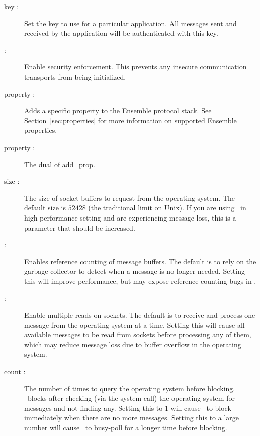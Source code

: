 \begin{description}
\item
[\mlval{-key} key :] Set the key to use for a particular application.  All
messages sent and received by the application will be authenticated with this
key.
\item
[\mlval{-secure} :] Enable security enforcement.  This prevents any insecure
communication transports from being initialized.
\item
[\mlval{-add\_prop} property :] Adds a specific property to the
Ensemble protocol stack. See Section~\ref{sec:properties} for more
information on supported Ensemble properties. 
\item 
[\mlval{-remove\_prop} property :] The dual of add\_prop.
\item 
[\mlval{-sock\_buf} size :] The size of socket buffers to request
from the operating system.  The default size is $52428$ (the
traditional limit on Unix).  If you are using \ensemble\ in
high-performance setting and are experiencing message loss, this is a
parameter that should be increased.
\item
[\mlval{-refcount} :] Enables reference counting of message buffers.
The default is to rely on the garbage collector to detect when a
message is no longer needed.  Setting this will improve performance,
but may expose reference counting bugs in \ensemble.
\item 
[\mlval{-multiread} :] Enable multiple reads on sockets.  The default
is to receive and process one message from the operating system
at a time.  Setting this will cause all available messages to be read
from sockets before processing any of them, which may reduce message
loss due to buffer overflow in the operating system.
\item
[\mlval{-pollcount} count :] The number of times to query the
operating system before blocking.  \ensemble\ blocks after checking
(via the  system call) the operating system for
messages and not finding any.  Setting this to $1$ will cause
\ensemble\ to block immediately when there are no more messages.
Setting this to a large number will cause \ensemble\ to busy-poll for
a longer time before blocking.
\end{description}

